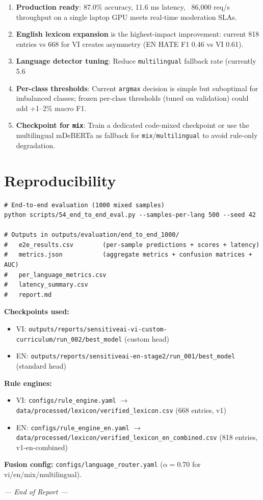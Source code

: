 \documentclass[11pt,a4paper]{article}
\begin{document}
\begin{enumerate}
    \item \textbf{Production ready}: 87.0\% accuracy, 11.6 ms latency, ~86,000 req/s throughput on a single laptop GPU meets real-time moderation SLAs.
    \item \textbf{English lexicon expansion} is the highest-impact improvement: current 818 entries vs 668 for VI creates asymmetry (EN HATE F1 0.46 vs VI 0.61).
    \item \textbf{Language detector tuning}: Reduce \texttt{multilingual} fallback rate (currently 5.6%
    \item \textbf{Per-class thresholds}: Current \texttt{argmax} decision is simple but suboptimal for imbalanced classes; frozen per-class thresholds (tuned on validation) could add +1--2\% macro F1.
    \item \textbf{Checkpoint for \texttt{mix}}: Train a dedicated code-mixed checkpoint or use the multilingual mDeBERTa as fallback for \texttt{mix}/\texttt{multilingual} to avoid rule-only degradation.
\end{enumerate}

\section{Reproducibility}
\label{sec:repro}

\begin{verbatim}
# End-to-end evaluation (1000 mixed samples)
python scripts/54_end_to_end_eval.py --samples-per-lang 500 --seed 42

# Outputs in outputs/evaluation/end_to_end_1000/
#   e2e_results.csv        (per-sample predictions + scores + latency)
#   metrics.json           (aggregate metrics + confusion matrices + AUC)
#   per_language_metrics.csv
#   latency_summary.csv
#   report.md
\end{verbatim}

\medskip
\textbf{Checkpoints used:}
\begin{itemize}
    \item VI: \texttt{outputs/reports/sensitiveai-vi-custom-curriculum/run\_002/best\_model} (custom head)
    \item EN: \texttt{outputs/reports/sensitiveai-en-stage2/run\_001/best\_model} (standard head)
\end{itemize}

\medskip
\textbf{Rule engines:}
\begin{itemize}
    \item VI: \texttt{configs/rule\_engine.yaml} $\rightarrow$ \texttt{data/processed/lexicon/verified\_lexicon.csv} (668 entries, v1)
    \item EN: \texttt{configs/rule\_engine\_en.yaml} $\rightarrow$ \texttt{data/processed/lexicon/verified\_lexicon_en_combined.csv} (818 entries, v1-en-combined)
\end{itemize}

\medskip
\textbf{Fusion config:} \texttt{configs/language\_router.yaml} ($\alpha=0.70$ for vi/en/mix/multilingual).

\vfill
\begin{center}
\textit{--- End of Report ---}
\end{center}
\end{document}
